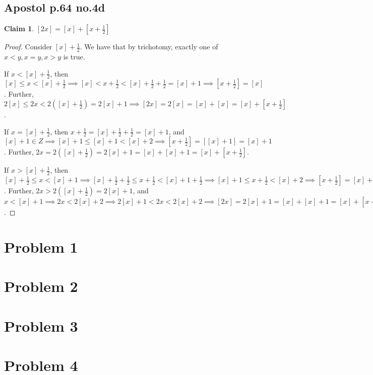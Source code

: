 \documentclass[12pt,letterpaper]{article}
\theoremstyle{definition}
\newtheorem*{claim}{Claim}
\begin{document}
\subsection*{Apostol p.64 no.4d}

\begin{claim}
  $[2x] = [x] + [x + \frac{1}{2}]$
\end{claim}

\begin{proof}
  Consider $[x] + \frac{1}{2}$. We have that by trichotomy, exactly one of
  $x < y, x = y, x > y$ is true.

  If $x < [x]+\frac{1}{2}$, then $[x] \leq x < [x] + \frac{1}{2} \implies [x]
  < x + \frac{1}{2} < [x] + \frac{1}{2} + \frac{1}{2} = [x] + 1 \implies [x +
  \frac{1}{2}] = [x]$. Further, $2[x] \leq 2x < 2([x] + \frac{1}{2}) = 2[x] + 1 \implies [2x]
  = 2[x] = [x] + [x] = [x] + [x + \frac{1}{2}]$.

  If $x = [x]+\frac{1}{2}$, then $x + \frac{1}{2} = [x] + \frac{1}{2} + \frac{1}{2} = [x] +
  1$, and $[x] + 1 \in Z \implies [x] + 1 \leq [x] + 1 < [x] + 2 \implies [x +
  \frac{1}{2}] = [[x] + 1] = [x] + 1$. Further, $2x = 2([x] + \frac{1}{2}) = 2[x]
  + 1 = [x] + [x] + 1 = [x] + [x + \frac{1}{2}]$.

  If $x > [x]+\frac{1}{2}$, then $[x] + \frac{1}{2} \leq x < [x] + 1 \implies [x] +
  \frac{1}{2} + \frac{1}{2} \leq x + \frac{1}{2} < [x] + 1 + \frac{1}{2}
  \implies [x] + 1 \leq x + \frac{1}{2} < [x] + 2 \implies [x + \frac{1}{2}] =
  [x] + 1$. Further, $2x > 2([x] + \frac{1}{2}) = 2[x] + 1$, and $x < [x] + 1
  \implies 2x < 2[x] + 2 \implies 2[x] + 1 < 2x < 2[x] + 2 \implies [2x] = 2[x]
  + 1 = [x] + [x] + 1 = [x] + [x + \frac{1}{2}]$.
\end{proof}

\section*{Problem 1}
\section*{Problem 2}
\section*{Problem 3}
\section*{Problem 4}
\end{document}
